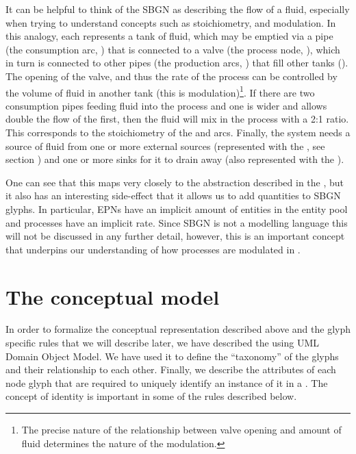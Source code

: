 It can be helpful to think of the SBGN \PD as describing the flow of a fluid, especially when trying to understand concepts such as stoichiometry, and modulation. In this analogy, each  represents a tank of fluid, which may be emptied via a pipe (the consumption arc, ) that is connected to a valve (the process node, ), which in turn is connected to other pipes (the production arcs, ) that fill other tanks (). The opening of the valve, and thus the rate of the process can be controlled by the volume of fluid in another tank (this is modulation)\footnote{The precise nature of the relationship between valve opening and amount of fluid determines the nature of the modulation.}. If there are two consumption pipes feeding fluid into the process and one is wider and allows double the flow of the first, then the fluid will mix in the process with a 2:1 ratio. This corresponds to the stoichiometry of the  and  arcs. Finally, the system needs a source of fluid from one or more external sources (represented with the , see section ) and one or more sinks for it to drain away (also represented with the ).

One can see that this maps very closely to the abstraction described in the \PDl, but it also has an interesting side-effect that it allows us to add quantities to SBGN glyphs. In particular, EPNs have an implicit amount of entities in the entity pool and processes have an implicit rate. Since SBGN \PD is not a modelling language this will not be discussed in any further detail, however, this is an important concept that underpins our understanding of how processes are modulated in .

\section{The conceptual model}
\label{sec:conceptual-model}

In order to formalize the conceptual representation described above and the glyph specific rules that we will describe later, we have described the \PDl using UML Domain Object Model. We have used it to define the ``taxonomy'' of the \PD glyphs and their relationship to each other. Finally, we describe the attributes of each node glyph that are required to uniquely identify an instance of it in a \PDm. The concept of identity is important in some of the rules described below.

